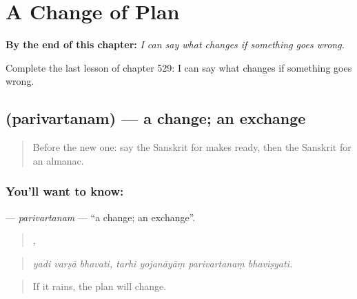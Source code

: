 
\chapter{A Change of Plan}
\label{ch:sa-a-change-of-plan}

\begin{chapteropening}
\textbf{By the end of this chapter:} \emph{I can say what changes if something goes wrong.}

Complete the last lesson of chapter 529: I can say what changes if something goes wrong.
\end{chapteropening}

\section[\texorpdfstring{\sk{परिवर्तनम्} (parivartanam)}{परिवर्तनम् (parivartanam)}]{ (parivartanam) — a change; an exchange}

\label{lesson:SA-C529-parivartanam}



\begin{quote}
Before the new one: say the Sanskrit for makes ready, then the Sanskrit for an almanac.
\end{quote}

\subsection*{You'll want to know: }
\textbf{} — \emph{parivartanam} — \textquotedblleft{}a change; an exchange\textquotedblright{}.

\begin{quote}
  ,    
\end{quote}

\begin{quote}
\emph{yadi varṣā bhavati, tarhi yojanāyāṃ parivartanaṃ bhaviṣyati.}
\end{quote}

\begin{quote}
If it rains, the plan will change.
\end{quote}

